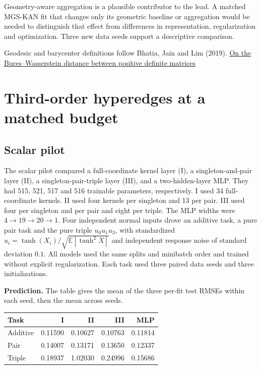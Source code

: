 \documentclass[11pt]{article}
\numberwithin{equation}{section}
\begin{document}
Geometry-aware aggregation is a plausible contributor to the lead. A matched MGS-KAN fit that
changes only its geometric baseline or aggregation would be needed to distinguish that effect
from differences in representation, regularization and optimization. Three new data seeds
support a descriptive comparison.

Geodesic and barycenter definitions follow Bhatia, Jain and Lim (2019).
\href{https://arxiv.org/abs/1712.01504}{On the Bures--Wasserstein distance between positive
definite matrices}

\section{Third-order hyperedges at a matched budget}
\label{sec:hyperedge-order}

\subsection{Scalar pilot}

The scalar pilot compared a full-coordinate kernel layer (I), a
singleton-and-pair layer (II), a singleton-pair-triple layer (III), and
a two-hidden-layer MLP. They had 515, 521, 517 and 516 trainable parameters,
respectively. I used 34 full-coordinate kernels. II used four kernels per
singleton and 13 per pair. III used four per singleton and per pair and
eight per triple. The MLP widths were \(4\to19\to20\to1\).
Four independent normal inputs drove an additive task, a
pure pair task and the pure triple \(u_0u_1u_3\), with standardized
\(u_i=\tanh(X_i)/\sqrt{\mathbb E[\tanh^2 X]}\) and independent response
noise of standard deviation \(0.1\). All models used the same splits and
minibatch order and trained without explicit regularization. Each task
used three paired data seeds and three initializations.

\textbf{Prediction.} The table gives the mean of the three per-fit test RMSEs
within each seed, then the mean across seeds.

\begin{center}
\small
\begin{tabularx}{\linewidth}{@{} Y r r r r @{}}
\toprule
\textbf{Task} & \textbf{I} & \textbf{II} & \textbf{III} & \textbf{MLP} \\
\midrule
Additive & 0.11590 & 0.10627 & 0.10763 & 0.11814 \\
Pair & 0.14007 & 0.13171 & 0.13650 & 0.12337 \\
Triple & 0.18937 & 1.02030 & 0.24996 & 0.15686 \\
\bottomrule
\end{tabularx}
\end{center}
\end{document}

